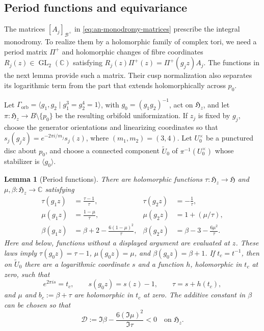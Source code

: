 \documentclass[11pt]{article}
\newtheorem{lemma}[theorem]{Lemma}
\theoremstyle{definition}
\theoremstyle{remark}
\numberwithin{equation}{section}
\newcommand{\CC}{\mathbb C}
\begin{document}
\subsection{Period functions and equivariance}

The matrices $[A_j]_{\mathcal B^+}$ in
\eqref{eq:an-monodromy-matrices} prescribe the integral monodromy.  To
realize them by a holomorphic family of complex tori, we need a period matrix
$\Pi^+$ and
holomorphic changes of fibre coordinates $R_j(z)\in\operatorname{GL}_2(\CC)$
satisfying $R_j(z)\Pi^+(z)=\Pi^+(g_jz)A_j$.
The functions in the next lemma provide such a matrix.  Their cusp
normalization also separates its logarithmic term from the part that extends
holomorphically across $p_0$.

Let $\Gamma_{\mathrm{orb}}
=\langle g_1,g_2\mid g_1^3=g_2^4=1\rangle$, with
$g_0=(g_1g_2)^{-1}$, act on $\mathfrak H_z$, and let
$\pi:\mathfrak H_z\to B\setminus\{p_0\}$ be the resulting orbifold
uniformization.  If $z_j$ is fixed by
$g_j$, choose the generator orientations and linearizing coordinates so
that $s_j(g_jz)=e^{-2\pi i/m_j}s_j(z)$, where
$(m_1,m_2)=(3,4)$.
Let $U_0^\times$ be a punctured disc about $p_0$, and choose a connected
component $\widetilde U_0$ of $\pi^{-1}(U_0^\times)$ whose stabilizer is
$\langle g_0\rangle$.

\begin{lemma}[Period functions]\label{lem:an-period-functions}
There are holomorphic functions
$\tau:\mathfrak H_z\to\mathfrak H$ and
$\mu,\beta:\mathfrak H_z\to\CC$ satisfying
\begin{align}
 \tau(g_1z)&=\frac{\tau-1}{\tau},
 &\tau(g_2z)&=-\frac1\tau,\label{eq:an-tau-laws}\\
 \mu(g_1z)&=\frac{1-\mu}{\tau},
 &\mu(g_2z)&=1+(\mu/\tau),\label{eq:an-mu-laws}\\
 \beta(g_1z)&=\beta+2-\frac{6(1-\mu)^2}{\tau},
 &\beta(g_2z)&=\beta-3-\frac{6\mu^2}{\tau}.
 \label{eq:an-beta-laws}
\end{align}
Here and below, functions without a displayed argument are evaluated at
$z$.  These laws imply $\tau(g_0z)=\tau-1$,
$\mu(g_0z)=\mu$, and $\beta(g_0z)=\beta+1$.
If $t_c=t^{-1}$, then on $\widetilde U_0$ there are a
logarithmic coordinate $s$ and a function $h$, holomorphic in $t_c$
at zero, such that
\begin{equation}\label{eq:an-log-coordinate}
 e^{2\pi is}=t_c,
 \qquad s(g_0z)=s(z)-1,
 \qquad \tau=s+h(t_c),
\end{equation}
and $\mu$ and $b_c:=\beta+\tau$ are holomorphic in $t_c$ at zero.
The additive constant in $\beta$ can be chosen so that
\begin{equation}\label{eq:an-D-negative}
 \mathcal D:=\Im\beta-\frac{6(\Im\mu)^2}{\Im\tau}<0
 \quad\text{on }\mathfrak H_z.
\end{equation}
\end{lemma}
\end{document}
